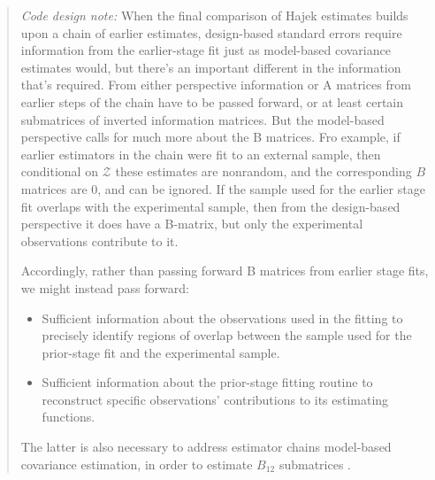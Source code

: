 \begin{quote}
  \textit{Code design note:}
  When the final comparison of Hajek estimates builds upon a chain of
  earlier estimates, design-based standard errors require information
  from the earlier-stage fit just as model-based covariance estimates
  would, but there's an important different in the information that's
  required. From either perspective  information or A matrices from
  earlier steps of the chain have to be passed forward, or at least
  certain submatrices of inverted information matrices.  But the
  model-based perspective calls for much more about the B matrices.
  Fro example, if earlier estimators in the chain were fit to an
  external sample, then conditional on $\mathcal{Z}$ these estimates
  are nonrandom, and the corresponding $B$ matrices are 0, and can be
  ignored.  If the sample used for the earlier stage fit overlaps with
  the experimental sample, then from the design-based perspective it
  does have a B-matrix, but only the experimental observations
  contribute to it.

  Accordingly, rather than passing forward B matrices from earlier
  stage fits, we might instead pass forward:
  \begin{itemize}
  \item Sufficient information about the observations used in the
    fitting to precisely identify regions of overlap between the
    sample used for the prior-stage fit and the experimental sample.
  \item Sufficient information about the prior-stage fitting routine
    to reconstruct specific observations' contributions to its estimating functions.
  \end{itemize}
The latter is also necessary to address estimator chains model-based
covariance estimation, in order to estimate $B_{12}$ submatrices
\citep[p.373]{carroll2006measurement}.
\end{quote}

